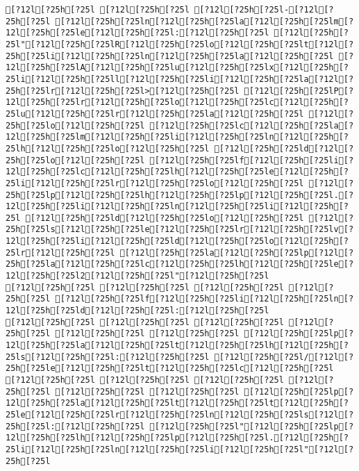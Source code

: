 \documentclass{scrartcl}
\begin{document}
\begin{Verbatim}
[?12l[?25h[?25l [?12l[?25h[?25l [?12l[?25h[?25l-[?12l[?25h[?25l [?12l[?25h[?25ln[?12l[?25h[?25la[?12l[?25h[?25lm[?12l[?25h[?25le[?12l[?25h[?25l:[?12l[?25h[?25l [?12l[?25h[?25l"[?12l[?25h[?25lR[?12l[?25h[?25lo[?12l[?25h[?25lt[?12l[?25h[?25li[?12l[?25h[?25ln[?12l[?25h[?25la[?12l[?25h[?25l [?12l[?25h[?25lA[?12l[?25h[?25lu[?12l[?25h[?25lx[?12l[?25h[?25li[?12l[?25h[?25ll[?12l[?25h[?25li[?12l[?25h[?25la[?12l[?25h[?25lr[?12l[?25h[?25l>[?12l[?25h[?25l [?12l[?25h[?25lP[?12l[?25h[?25lr[?12l[?25h[?25lo[?12l[?25h[?25lc[?12l[?25h[?25lu[?12l[?25h[?25lr[?12l[?25h[?25la[?12l[?25h[?25l [?12l[?25h[?25lo[?12l[?25h[?25l [?12l[?25h[?25lc[?12l[?25h[?25la[?12l[?25h[?25lm[?12l[?25h[?25li[?12l[?25h[?25ln[?12l[?25h[?25lh[?12l[?25h[?25lo[?12l[?25h[?25l [?12l[?25h[?25ld[?12l[?25h[?25lo[?12l[?25h[?25l [?12l[?25h[?25lf[?12l[?25h[?25li[?12l[?25h[?25lc[?12l[?25h[?25lh[?12l[?25h[?25le[?12l[?25h[?25li[?12l[?25h[?25lr[?12l[?25h[?25lo[?12l[?25h[?25l [?12l[?25h[?25lp[?12l[?25h[?25lh[?12l[?25h[?25lp[?12l[?25h[?25l.[?12l[?25h[?25li[?12l[?25h[?25ln[?12l[?25h[?25li[?12l[?25h[?25l [?12l[?25h[?25ld[?12l[?25h[?25lo[?12l[?25h[?25l [?12l[?25h[?25ls[?12l[?25h[?25le[?12l[?25h[?25lr[?12l[?25h[?25lv[?12l[?25h[?25li[?12l[?25h[?25ld[?12l[?25h[?25lo[?12l[?25h[?25lr[?12l[?25h[?25l [?12l[?25h[?25la[?12l[?25h[?25lp[?12l[?25h[?25la[?12l[?25h[?25lc[?12l[?25h[?25lh[?12l[?25h[?25le[?12l[?25h[?25l2[?12l[?25h[?25l"[?12l[?25h[?25l
[?12l[?25h[?25l [?12l[?25h[?25l [?12l[?25h[?25l [?12l[?25h[?25l [?12l[?25h[?25lf[?12l[?25h[?25li[?12l[?25h[?25ln[?12l[?25h[?25ld[?12l[?25h[?25l:[?12l[?25h[?25l
[?12l[?25h[?25l [?12l[?25h[?25l [?12l[?25h[?25l [?12l[?25h[?25l [?12l[?25h[?25l [?12l[?25h[?25l [?12l[?25h[?25lp[?12l[?25h[?25la[?12l[?25h[?25lt[?12l[?25h[?25lh[?12l[?25h[?25ls[?12l[?25h[?25l:[?12l[?25h[?25l [?12l[?25h[?25l/[?12l[?25h[?25le[?12l[?25h[?25lt[?12l[?25h[?25lc[?12l[?25h[?25l
[?12l[?25h[?25l [?12l[?25h[?25l [?12l[?25h[?25l [?12l[?25h[?25l [?12l[?25h[?25l [?12l[?25h[?25l [?12l[?25h[?25lp[?12l[?25h[?25la[?12l[?25h[?25lt[?12l[?25h[?25lt[?12l[?25h[?25le[?12l[?25h[?25lr[?12l[?25h[?25ln[?12l[?25h[?25ls[?12l[?25h[?25l:[?12l[?25h[?25l [?12l[?25h[?25l"[?12l[?25h[?25lp[?12l[?25h[?25lh[?12l[?25h[?25lp[?12l[?25h[?25l.[?12l[?25h[?25li[?12l[?25h[?25ln[?12l[?25h[?25li[?12l[?25h[?25l"[?12l[?25h[?25l

\end{Verbatim}
\end{document}
